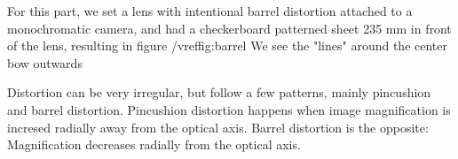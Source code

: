
For this part, we set a lens with intentional barrel distortion 
attached to a monochromatic camera, and had a checkerboard 
patterned sheet 235 mm in front of the lens, resulting in figure /vref{fig:barrel}
We see the "lines" around the center bow outwards 

Distortion can be very irregular, but follow a few patterns, mainly
pincushion and barrel distortion. Pincushion distortion happens when 
image magnification is incresed radially away from the optical axis. 
Barrel distortion is the opposite: Magnification decreases radially
from the optical axis. 